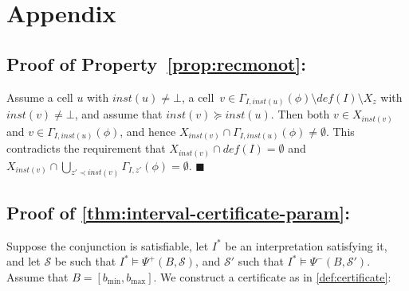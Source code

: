 \documentclass[runningheads]{llncs}
\newcommand{\qedhere}{$\blacksquare$}
\begin{document}



\appendix

\section{Appendix}

\subsection*{Proof of Property~\ref{prop:recmonot}:}

  Assume a cell $u$ with $\mathit{inst}(u)\neq\bot$, a  cell~$v\in\Gamma_{I,\mathit{inst}(u)}(\phi)\setminus \mathit{def}(I)\setminus X_z$ with $\mathit{inst}(v)\neq\bot$, and assume that $\mathit{inst}(v)\succeq \mathit{inst}(u)$. Then both $v\in X_{\mathit{inst}(v)}$ and $v \in \Gamma_{I,\mathit{inst}(u)}(\phi)$, and hence $X_{\mathit{inst}(v)}\cap \Gamma_{I,\mathit{inst}(u)}(\phi)\neq\emptyset$. 
  This contradicts the requirement that $X_{\mathit{inst}(v)}\cap \mathit{def}(I)=\emptyset$ and $X_{\mathit{inst}(v)}\cap\bigcup_{z'\prec \mathit{inst}(v)} \Gamma_{I,z'}(\phi)=\emptyset$.
  \qedhere


\subsection*{Proof of \cref{thm:interval-certificate-param}:}

  Suppose the conjunction is satisfiable, let $I^*$ be an interpretation satisfying it, and let $\mathcal{S}$ be such that $I^*\models \Psi^+(B,\mathcal{S})$, and $\mathcal{S}'$ such that $I^*\models \Psi^-(B,\mathcal{S}')$. Assume that  $B = [b_{\min}, b_{\max}]$. We construct a certificate as in \cref{def:certificate}:
\end{document}
